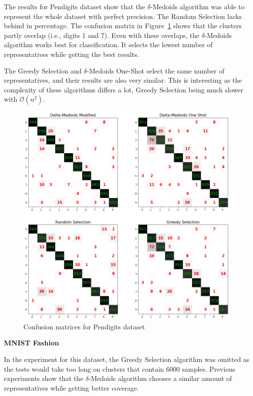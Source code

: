 \documentclass[thesis=B,english]{FITthesis}[2012/10/20]
\begin{document}
\noindent The results for Pendigits dataset show that the $\delta$-Medoids algorithm was able to represent the whole dataset with perfect precision.
The Random Selection lacks behind in percentage.
The confusion matrix in Figure~\ref{img:exp3_pendigits} shows that the clusters partly overlap (i.e., digits 1 and 7).
Even with these overlaps, the $\delta$-Medoids algorithm works best for classification.
It selects the lowest number of representatives while getting the best results.

The Greedy Selection and $\delta$-Medoids One-Shot select the same number of representatives, and their results are also very similar.
This is interesting as the complexity of these algorithms differs a lot, Greedy Selection being much slower with $\mathcal{O}(n^2)$.
\medskip
\begin{figure}[t]
   \includegraphics[width=\linewidth]{img/exp3_pendigits.png}
  \caption{Confusion matrices for Pendigits dataset}
  \label{img:exp3_pendigits}
\end{figure}

\noindent \textbf{MNIST Fashion}

In the experiment for this dataset, the Greedy Selection algorithm was omitted as the tests would take too long on clusters that contain 6000 samples.
Previous experiments show that the $\delta$-Medoids algorithm chooses a similar amount of representatives while getting better coverage.
\end{document}
